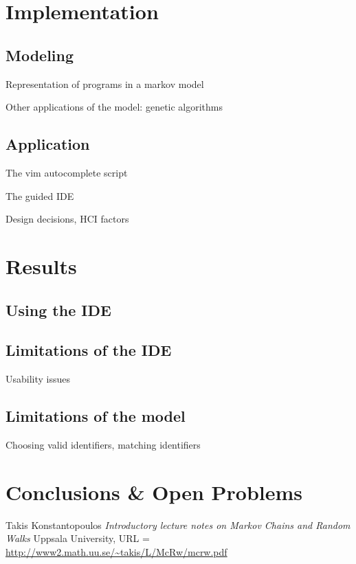 \documentclass{article}
\begin{document}

\section{Implementation}

\subsection{Modeling}

Representation of programs in a markov model

Other applications of the model: genetic algorithms

\subsection{Application}

The vim autocomplete script

The guided IDE

Design decisions, HCI factors

\section{Results}

\subsection{Using the IDE}

\subsection{Limitations of the IDE}

Usability issues

\subsection{Limitations of the model}

Choosing valid identifiers, matching identifiers

\section{Conclusions \& Open Problems}

\begin{thebibliography}{1}

	 Takis Konstantopoulos {\em Introductory lecture notes on
	Markov Chains and Random Walks} Uppsala University, URL = \url{http://www2.math.uu.se/~takis/L/McRw/mcrw.pdf}
 
\end{thebibliography}
\end{document}
